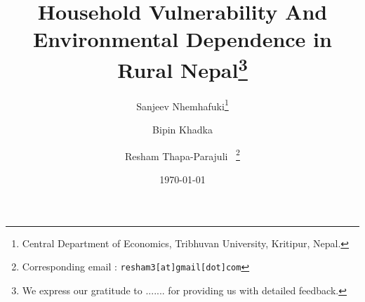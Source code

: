 \begin{titlepage}
\title{\vspace{-2.0cm}Household Vulnerability And Environmental Dependence in Rural Nepal\footnote{We express our gratitude to ....... for providing us with detailed feedback.}
}
\author{Sanjeev Nhemhafuki\thanks{Central Department of Economics, Tribhuvan University, Kritipur, Nepal.} \and   Bipin Khadka \footnotemark[2]
\and Resham  Thapa-Parajuli \footnotemark[2]  ~\thanks{Corresponding email : \texttt{resham3[at]gmail[dot]com}}}
\date{\today}
\maketitle

\thispagestyle{empty}
\end{titlepage}
\pagebreak 
